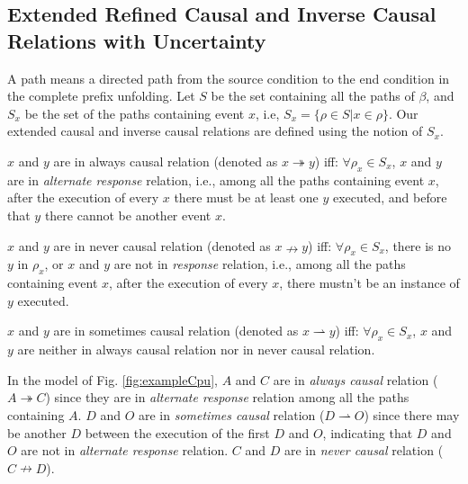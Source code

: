 \documentclass{llncs}
\begin{document}
\subsection{Extended Refined Causal and Inverse Causal Relations with Uncertainty}\label{subsec:causalAndInverseCausal}
A path means a directed path from the source condition to the end condition in the complete prefix unfolding. Let $S$ be the set containing all the paths of $\beta$, and $S_{x}$ be the set of the paths containing event $x$, i.e, $S_{x}=\{\rho\in S|x\in\rho\}$. Our extended causal and inverse causal relations are defined using the notion of $S_{x}$.

\begin{definition}\label{def:alwaysCausal}
$x$ and $y$ are in always causal relation (denoted as $x\twoheadrightarrow y$) iff: $\forall\rho_{x}\in S_{x}$, $x$ and $y$ are in \textit{alternate response} relation, i.e., among all the paths containing event $x$, after the execution of every $x$ there must be at least one $y$ executed, and before that $y$ there cannot be another event $x$.
\end{definition}

\begin{definition}\label{def:neverCausal}
$x$ and $y$ are in never causal relation (denoted as $x\nrightarrow y$) iff: $\forall\rho_{x}\in S_{x}$, there is no $y$ in $\rho_{x}$, or $x$ and $y$ are not in \textit{response} relation, i.e., among all the paths containing event $x$, after the execution of every $x$, there mustn't be an instance of $y$ executed.
\end{definition}

\begin{definition}\label{def:sometimesCausal}
$x$ and $y$ are in sometimes causal relation (denoted as $x\rightharpoonup y$) iff: $\forall\rho_{x}\in S_{x}$, $x$ and $y$ are neither in always causal relation nor in never causal relation.
\end{definition}

\begin{example}\label{ex:causalRelation}
In the model of Fig. \ref{fig:exampleCpu}, $A$ and $C$ are in \textit{always causal} relation ($A\twoheadrightarrow C$) since they are in \textit{alternate response} relation among all the paths containing $A$. $D$ and $O$ are in \textit{sometimes causal} relation ($D\rightharpoonup O$) since there may be another $D$ between the execution of the first $D$ and $O$, indicating that $D$ and $O$ are not in \textit{alternate response} relation. $C$ and $D$ are in \textit{never causal} relation ($C\nrightarrow D$).
\end{example}
\end{document}
